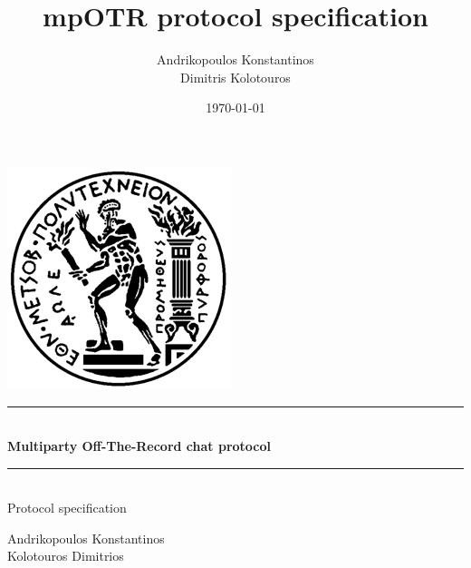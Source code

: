 \documentclass[12pt,titlepage,a4paper]{article}
\author{Andrikopoulos Konstantinos\\
Dimitris Kolotouros}
\date{\today}
\title{mpOTR protocol specification}
\newcommand{\HRule}{\rule{\linewidth}{0.5mm}}
\begin{document}
\newlength\mylen
\newcommand\KwExtraIn[1]{%
	\settowidth\mylen{\KwIn{}}%
	\setlength\hangindent{\mylen}%
	\hspace*{\mylen}#1\\}

\newcommand\NextYear{%
  \advance\year by 1 \the\year\advance\year by -1}
\newcommand\PrevYear{%
  \advance\year by -1 \the\year\advance\year by 1}

\begin{titlepage}
\centering

\includegraphics{Pyrforos.png}\\[1cm]



\vspace{1cm}

\HRule \\[0.4cm]

{\huge \bfseries Multiparty Off-The-Record chat protocol\\} %

\vspace{0.4cm}
\HRule \\[0.4cm]

{\Large Protocol specification}


\vfill
\begin{center}
\large
Andrikopoulos Konstantinos\\
Kolotouros Dimitrios



\vfill
\the\year\

\end{center}



\end{titlepage}
\end{document}
